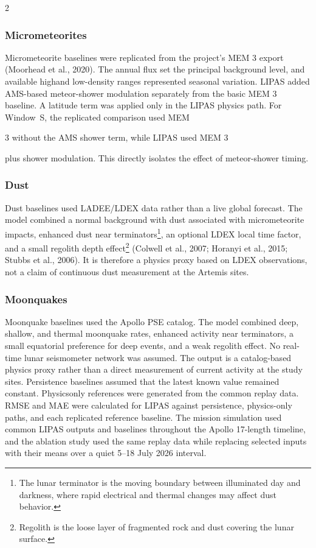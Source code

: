 \begin{multicols*}{2}
\subsubsection{Micrometeorites}

Micrometeorite baselines were replicated from the project's MEM 3 export (Moorhead et al., 2020). The annual flux set the principal background level, and available highand low-density ranges represented seasonal variation. LIPAS added AMS-based meteor-shower modulation separately from the basic MEM 3 baseline. A latitude term was applied only in the LIPAS physics path. For Window~S, the replicated comparison used MEM

3 without the AMS shower term, while LIPAS used MEM 3

plus shower modulation. This directly isolates the effect of meteor-shower timing.

\subsubsection{Dust}

Dust baselines used LADEE/LDEX data rather than a live global forecast. The model combined a normal background with dust associated with micrometeorite impacts, enhanced dust near terminators\footnote{The lunar terminator is the moving boundary between illuminated day and darkness, where rapid electrical and thermal changes may affect dust behavior.}, an optional LDEX local time factor, and a small regolith depth effect\footnote{Regolith is the loose layer of fragmented rock and dust covering the lunar surface.} (Colwell et al., 2007; Horanyi et al., 2015; Stubbs et al., 2006). It is therefore a physics proxy based on LDEX observations, not a claim of continuous dust measurement at the Artemis sites.

\subsubsection{Moonquakes}

Moonquake baselines used the Apollo PSE catalog. The model combined deep, shallow, and thermal moonquake rates, enhanced activity near terminators, a small equatorial preference for deep events, and a weak regolith effect. No real-time lunar seismometer network was assumed. The output is a catalog-based physics proxy rather than a direct measurement of current activity at the study sites. Persistence baselines assumed that the latest known value remained constant. Physicsonly references were generated from the common replay data. RMSE and MAE were calculated for LIPAS against persistence, physics-only paths, and each replicated reference baseline. The mission simulation used common LIPAS outputs and baselines throughout the Apollo 17-length timeline, and the ablation study used the same replay data while replacing selected inputs with their means over a quiet 5--18 July 2026 interval.

\end{multicols*}
